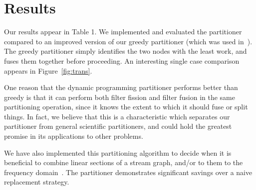 \section{Results}
\label{sec:results}


Our results appear in Table 1.  We implemented and evaluated the
partitioner compared to an improved version of our greedy partitioner
(which was used in~\cite{streamit-asplos}).  The greedy partitioner
simply identifies the two nodes with the least work, and fuses them
together before proceeding.  An interesting single case comparison
appears in Figure~\ref{fig:trans}.  

One reason that the dynamic programming partitioner performs better
than greedy is that it can perform both filter fission and filter
fusion in the same partitioning operation, since it knows the extent
to which it should fuse or split things.  In fact, we believe that
this is a characteristic which separates our partitioner from general
scientific partitioners, and could hold the greatest promise in its
applications to other problems.

We have also implemented this partitioning algorithm to decide when it
is beneficial to combine linear sections of a stream graph, and/or to
them to the frequency domain~\cite{lamb03}.  The partitioner
demonstrates significant savings over a naive replacement strategy.

